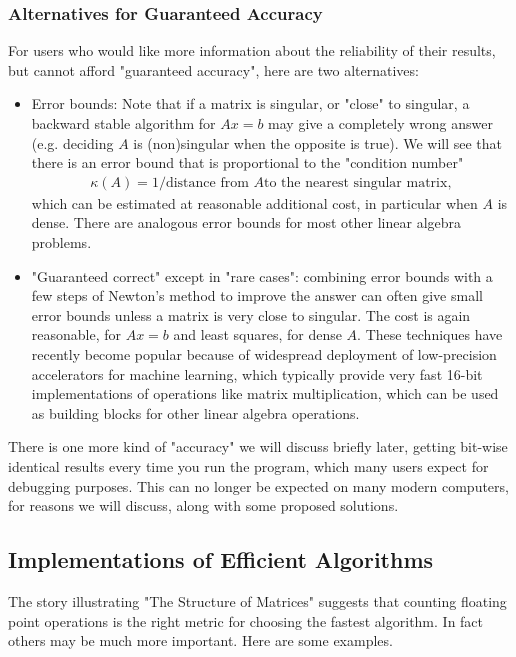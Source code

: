 \documentclass[11pt]{article}
\numberwithin{equation}{section}
\begin{document}
\subsubsection{Alternatives for Guaranteed Accuracy}
For users who would like more information about the reliability of their results, but cannot afford "guaranteed accuracy", here are two alternatives:
\begin{itemize}
    \item Error bounds: Note that if a matrix is singular, or "close" to singular, a backward stable algorithm for $Ax=b$ may give a completely wrong answer 
    (e.g. deciding $A$ is (non)singular when the opposite is true). We will see that there is an error bound that is proportional to the "condition number"
    \begin{align*}
        \kappa(A) = 1/\text{distance from }A \text{to the nearest singular matrix}, 
    \end{align*} 
    which can be estimated at reasonable additional cost, in particular when $A$ is dense. There are analogous error bounds for most other linear algebra problems.
    \item "Guaranteed correct" except in "rare cases": combining error bounds with a few steps of Newton's method to improve the answer can often give 
    small error bounds unless a matrix is very close to singular. The cost is again reasonable, for $Ax=b$ and least squares, for dense $A$. 
    These techniques have recently become popular because of widespread deployment of low-precision accelerators for machine learning, 
    which typically provide very fast 16-bit implementations of operations like matrix multiplication, 
    which can be used as building blocks for other linear algebra operations.    
\end{itemize}

There is one more kind of "accuracy" we will discuss briefly later, getting bit-wise identical results every time you run the program,
which many users expect for debugging purposes. This can no longer be expected on many modern computers, for reasons we will discuss, along with some proposed solutions.

\subsection{Implementations of Efficient Algorithms}
The story illustrating "The Structure of Matrices" suggests that counting floating point operations is the right metric for choosing the fastest algorithm.
In fact others may be much more important. Here are some examples.
\end{document}
